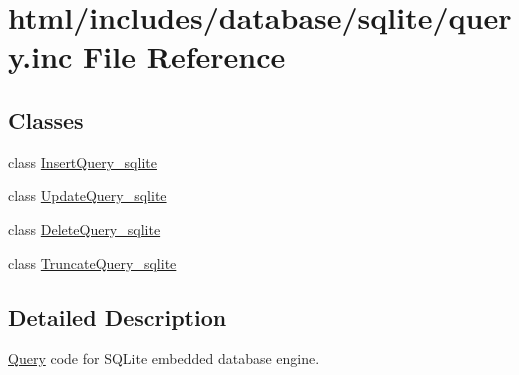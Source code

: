 \hypertarget{sqlite_2query_8inc}{
\section{html/includes/database/sqlite/query.inc File Reference}
\label{sqlite_2query_8inc}
}
\subsection*{Classes}
\begin{DoxyCompactItemize}
\item 
class \hyperlink{classInsertQuery__sqlite}{InsertQuery\_\-sqlite}
\item 
class \hyperlink{classUpdateQuery__sqlite}{UpdateQuery\_\-sqlite}
\item 
class \hyperlink{classDeleteQuery__sqlite}{DeleteQuery\_\-sqlite}
\item 
class \hyperlink{classTruncateQuery__sqlite}{TruncateQuery\_\-sqlite}
\end{DoxyCompactItemize}


\subsection{Detailed Description}
\hyperlink{classQuery}{Query} code for SQLite embedded database engine. 